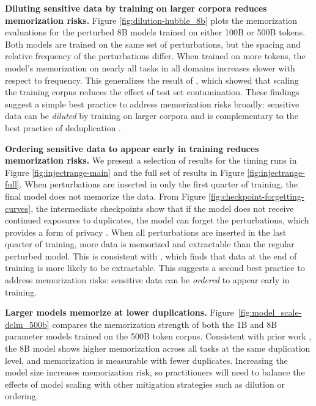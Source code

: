 \documentclass{article} %
\begin{document}
\textbf{Diluting sensitive data by training on larger corpora reduces memorization risks.} Figure \ref{fig:dilution-hubble_8b} plots the memorization evaluations for the perturbed 8B models trained on either 100B or 500B tokens. Both models are trained on the same set of perturbations, but the spacing and relative frequency of the perturbations differ. When trained on more tokens, the model's memorization on nearly all tasks in all domains increases slower with respect to frequency. This generalizes the result of \citet{bordt2025how}, which showed that scaling the training corpus reduces the effect of test set contamination. These findings suggest a simple best practice to address memorization risks broadly: sensitive data can be \textit{diluted} by training on larger corpora and is complementary to the best practice of deduplication \citep[recommended in][]{pmlr-v162-kandpal22a,lee-etal-2022-deduplicating}.

\textbf{Ordering sensitive data to appear early in training reduces memorization risks.} We present a selection of results for the timing runs in Figure \ref{fig:injectrange-main} and the full set of results in Figure \ref{fig:injectrange-full}. When perturbations are inserted in only the first quarter of training, the final model does not memorize the data. From Figure \ref{fig:checkpoint-forgetting-curves}, the intermediate checkpoints show that if the model does not receive continued exposures to duplicates, the model can forget the perturbations, which provides a form of privacy \citep{jagielski2023measuring,chang2024large}. When all perturbations are inserted in the last quarter of training, more data is memorized and extractable than the regular perturbed model. This is consistent with \cite{more2025realisticextractionattacksadversarial}, which finds that data at the end of training is more likely to be extractable. This suggests a second best practice to address memorization risks: sensitive data can be \textit{ordered} to appear early in training. 

\textbf{Larger models memorize at lower duplications.} Figure~\ref{fig:model_scale-dclm_500b} compares the memorization strength of both the 1B and 8B parameter models trained on the 500B token corpus. Consistent with prior work \citep{tirumala2022memorization}, the 8B model shows higher memorization across all tasks at the same duplication level, and memorization is measurable with fewer duplicates. Increasing the model size increases memorization risk, so practitioners will need to balance the effects of model scaling with other mitigation strategies such as dilution or ordering.
\end{document}
